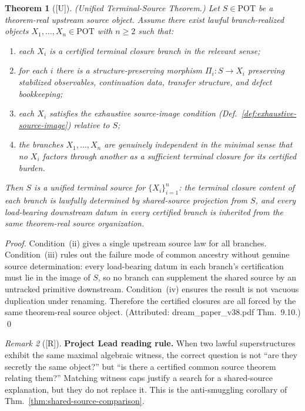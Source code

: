 \documentclass[12pt,oneside]{amsbook}
\theoremstyle{plain}
\newtheorem{theorem}{Theorem}[section]
\theoremstyle{definition}
\theoremstyle{remark}
\newtheorem{remark}[theorem]{Remark}
\newcommand{\status}[1]{\textup{[#1]}}
\begin{document}
\begin{theorem}[\status{U}]\label{thm:terminal-source}
\textup{(Unified Terminal-Source Theorem.)}
Let $S \in \mathrm{POT}$ be a theorem-real upstream source object.
Assume there exist lawful branch-realized objects
$X_1, \ldots, X_n \in \mathrm{POT}$ with $n \geq 2$ such that:
\begin{enumerate}[label=\textup{(\roman*)}]
  \item each $X_i$ is a certified terminal closure branch in the
    relevant sense;
  \item for each $i$ there is a structure-preserving morphism
    $\Pi_i : S \to X_i$ preserving stabilized observables,
    continuation data, transfer structure, and defect bookkeeping;
  \item each $X_i$ satisfies the exhaustive source-image condition
    (Def.~\ref{def:exhaustive-source-image}) relative to $S$;
  \item the branches $X_1, \ldots, X_n$ are genuinely independent
    in the minimal sense that no $X_i$ factors through another as a
    sufficient terminal closure for its certified burden.
\end{enumerate}
Then $S$ is a \emph{unified terminal source} for $\{X_i\}_{i=1}^n$:
the terminal closure content of each branch is lawfully determined by
shared-source projection from $S$, and every load-bearing downstream
datum in every certified branch is inherited from the same
theorem-real source organization.
\end{theorem}

\begin{proof}
Condition~(ii) gives a single upstream source law for all branches.
Condition~(iii) rules out the failure mode of common ancestry without
genuine source determination: every load-bearing datum in each
branch's certification must lie in the image of $S$, so no branch can
supplement the shared source by an untracked primitive downstream.
Condition~(iv) ensures the result is not vacuous duplication under
renaming.  Therefore the certified closures are all forced by the
same theorem-real source object.
(Attributed: dream\_paper\_v38.pdf Thm.~9.10.) \qed
\end{proof}

\begin{remark}[\status{R}]\label{rem:shared-source-reading-rule}
\textbf{Project Lead reading rule.}  When two lawful superstructures
exhibit the same maximal algebraic witness, the correct question is
not ``are they secretly the same object?'' but ``is there a certified
common source theorem relating them?''  Matching witness caps justify
a search for a shared-source explanation, but they do not replace it.
This is the anti-smuggling corollary of
Thm.~\ref{thm:shared-source-comparison}.
\end{remark}
\end{document}
